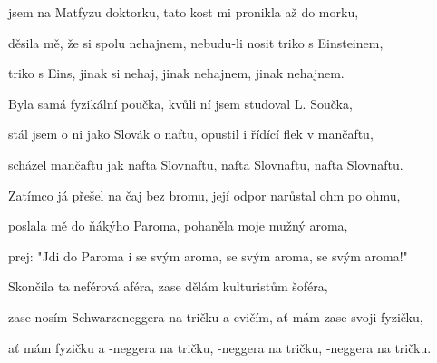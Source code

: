 

\zs
{} jsem na Matfyzu doktorku,
tato kost mi pronikla až do morku,

děsila mě, že si spolu nehajnem,
nebudu-li nosit triko s Einsteinem,

triko s Eins, jinak si nehaj,
jinak nehajnem, jinak nehajnem.
\ks

\zs
Byla samá fyzikální poučka,
kvůli ní jsem studoval L. Součka,

stál jsem o ni jako Slovák o naftu,
opustil i řídící flek v mančaftu,

scházel mančaftu jak nafta Slovnaftu,
nafta Slovnaftu, nafta Slovnaftu.
\ks

\zs
Zatímco já přešel na čaj bez bromu,
její odpor narůstal ohm po ohmu,

poslala mě do ňákýho Paroma,
pohaněla moje mužný aroma,

prej: "Jdi do Paroma i se svým aroma,
se svým aroma, se svým aroma!"
\ks

\zs
Skončila ta neférová aféra,
zase dělám kulturistům šoféra,

zase nosím Schwarzeneggera na tričku
a cvičím, ať mám zase svoji fyzičku,

ať mám fyzičku a -neggera na tričku,
-neggera na tričku, -neggera na tričku.
\ks

\kp























